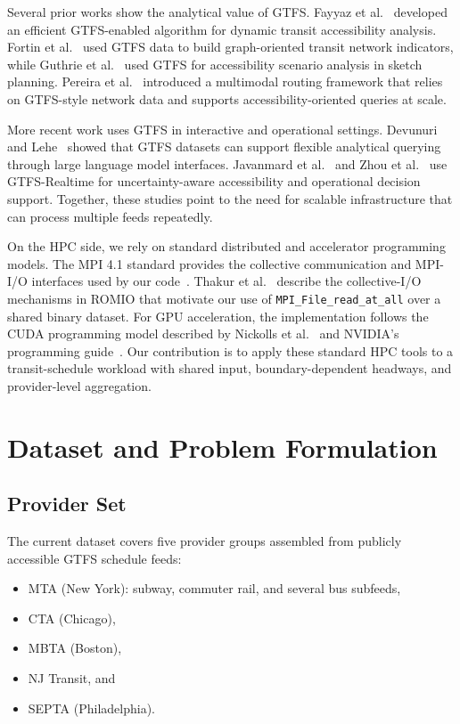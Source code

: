 \documentclass[sigconf,nonacm]{acmart}
\begin{document}
Several prior works show the analytical value of GTFS. Fayyaz et al.~\cite{fayyaz2017gtfs} developed an efficient GTFS-enabled algorithm for dynamic transit accessibility analysis. Fortin et al.~\cite{fortin2016gtfs} used GTFS data to build graph-oriented transit network indicators, while Guthrie et al.~\cite{guthrie2017accessibility} used GTFS for accessibility scenario analysis in sketch planning. Pereira et al.~\cite{pereira2021r5r} introduced a multimodal routing framework that relies on GTFS-style network data and supports accessibility-oriented queries at scale.

More recent work uses GTFS in interactive and operational settings. Devunuri and Lehe~\cite{devunuri2025transitgpt} showed that GTFS datasets can support flexible analytical querying through large language model interfaces. Javanmard et al.~\cite{javanmard2025realtime} and Zhou et al.~\cite{zhou2024latency} use GTFS-Realtime for uncertainty-aware accessibility and operational decision support. Together, these studies point to the need for scalable infrastructure that can process multiple feeds repeatedly.

On the HPC side, we rely on standard distributed and accelerator programming models. The MPI 4.1 standard provides the collective communication and MPI-I/O interfaces used by our code~\cite{mpi41}. Thakur et al.~\cite{thakur1999romio} describe the collective-I/O mechanisms in ROMIO that motivate our use of \texttt{MPI\_File\_read\_at\_all} over a shared binary dataset. For GPU acceleration, the implementation follows the CUDA programming model described by Nickolls et al.~\cite{nickolls2008cuda} and NVIDIA’s programming guide~\cite{cuda_guide}. Our contribution is to apply these standard HPC tools to a transit-schedule workload with shared input, boundary-dependent headways, and provider-level aggregation.

\section{Dataset and Problem Formulation}
\subsection{Provider Set}
The current dataset covers five provider groups assembled from publicly accessible GTFS schedule feeds:
\begin{itemize}[leftmargin=*]
  \item MTA (New York): subway, commuter rail, and several bus subfeeds,
  \item CTA (Chicago),
  \item MBTA (Boston),
  \item NJ Transit, and
  \item SEPTA (Philadelphia).
\end{itemize}
\end{document}
